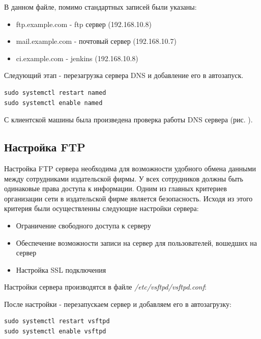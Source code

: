 В данном файле, помимо стандартных записей были указаны:
\begin{itemize}
	\item ftp.example.com - ftp сервер (192.168.10.8)
	\item mail.example.com - почтовый сервер (192.168.10.7)
	\item ci.example.com - jenkins (192.168.10.8)
\end{itemize}
Следующий этап - перезагрузка сервера DNS и добавление его в автозапуск.
\begin{lstlisting}
sudo systemctl restart named
sudo systemctl enable named
\end{lstlisting}
С клиентской машины была произведена проверка работы DNS сервера (рис. ).

\subsection{Настройка FTP}
Настройка FTP сервера необходима для возможности удобного обмена данными между сотрудниками издательской фирмы. У всех сотрудников должны быть одинаковые права доступа к информации. Одним из главных критериев организации сети в издательской фирме является безопасность. Исходя из этого критерия были осуществленны следующие настройки сервера:
\begin{itemize}
	\item Ограничение свободного доступа к серверу
	\item Обеспечение возможности записи на сервер для пользователей, вошедших на сервер
	\item Настройка SSL подключения
\end{itemize}
Настройки сервера производятся в файле \textit{/etc/vsftpd/vsftpd.conf}:

После настройки - перезапускаем сервер и добавляем его в автозагрузку:
\begin{lstlisting}
sudo systemctl restart vsftpd
sudo systemctl enable vsftpd
\end{lstlisting}

